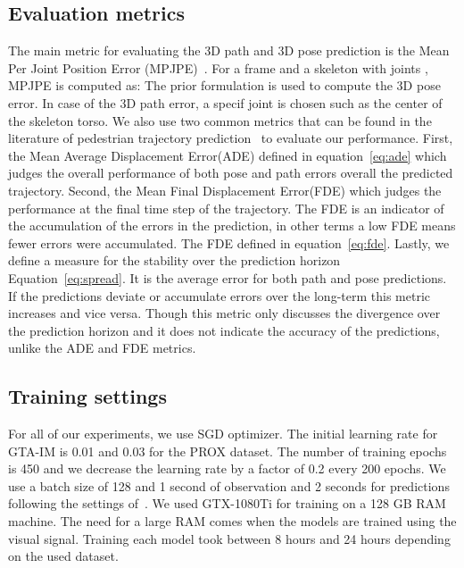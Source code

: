 \documentclass[10pt,twocolumn,letterpaper]{article}
\begin{document}
\subsection{Evaluation metrics}
The main metric for evaluating the 3D path and 3D pose prediction is the Mean Per Joint Position Error (MPJPE)~\cite{6682899}. For a frame  and a skeleton with  joints , MPJPE is computed as:
The prior formulation is used to compute the 3D pose error. In case of the 3D path error, a specif joint is chosen such as the center of the skeleton torso. We also use two common metrics that can be found in the literature of pedestrian trajectory prediction~\cite{alahi2016social,gupta2018social,mohamed2020social} to evaluate our performance. First, the Mean Average Displacement Error(ADE) defined in equation~\ref{eq:ade} which judges the overall performance of both pose and path errors overall the predicted trajectory. Second, the Mean Final Displacement Error(FDE) which judges the performance at the final time step of the trajectory. The FDE is an indicator of the accumulation of the errors in the prediction, in other terms a low FDE means fewer errors were accumulated. The FDE defined in equation~\ref{eq:fde}. Lastly, we define a measure for the stability over the prediction horizon  Equation~\ref{eq:spread}. It is the average error for both path and pose predictions. If the predictions deviate or accumulate errors over the long-term this metric increases and vice versa. Though this metric only discusses the divergence over the prediction horizon and it does not indicate the accuracy of the predictions, unlike the ADE and FDE metrics. 






\subsection{Training settings}
For all of our experiments, we use SGD optimizer. The initial learning rate for GTA-IM is 0.01 and 0.03 for the PROX dataset. The number of training epochs is 450 and we decrease the learning rate by a factor of 0.2 every 200 epochs. We use a batch size of 128 and 1 second of observation and 2 seconds for predictions following the settings of~\cite{cao2020long}. We used GTX-1080Ti for training on a 128 GB RAM machine. The need for a large RAM comes when the models are trained using the visual signal. Training each model took between 8 hours and 24 hours depending on the used dataset.
\end{document}
